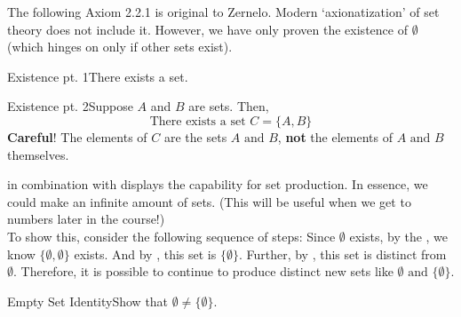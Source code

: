 \vspace*{\fill}

    The following Axiom 2.2.1 is original to Zernelo. Modern `axionatization' of set theory does not include it. However, we have only proven the existence of $\emptyset$ (which hinges on only if other sets exist).

    \begin{axiom}
        {Existence pt. 1}There exists a set.
    \end{axiom}

    \vspace{0.5cm}
    
    \begin{axiom}
        {Existence pt. 2}Suppose $A$ and $B$ are sets. Then, $$\text{There exists a set } C = \{A,B\}$$
        \caution \hspace{0.5em} \textbf{Careful}! The elements of $C$ are the sets $A \text{ and } B$, \textbf{not} the elements of $A \text{ and } B$ themselves.
    \end{axiom}


\newpage

     in combination with   displays the capability for set production. In essence, we could make an infinite amount of sets. (This will be useful when we get to numbers later in the course!) \\
    
    To show this, consider the following sequence of steps: Since $\emptyset$ exists, by the , we know $\{\emptyset,\emptyset\}$ exists. And by , this set is $\{\emptyset\}$. Further, by , this set is distinct from $\emptyset$. Therefore, it is possible to continue to produce distinct new sets like $\emptyset \text{ and } \{\emptyset\}$.

    \begin{exercise}
        {Empty Set Identity}Show that $\emptyset \ne \{\emptyset\}$.
    \end{exercise}


